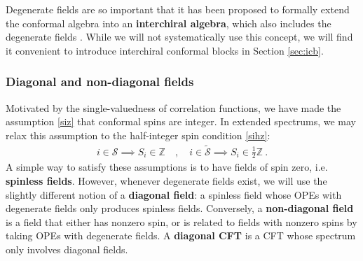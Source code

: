 \documentclass[12pt, a4paper]{article}
\theoremstyle{break}
\begin{document}
Degenerate fields are so important that it has been proposed to formally extend the conformal algebra into an \textbf{interchiral algebra}, which also includes the degenerate fields \cite{grs12}. While we will not systematically use this concept, we will find it convenient to introduce interchiral conformal blocks in Section \ref{sec:icb}. 

\subsubsection{Diagonal and non-diagonal fields}

Motivated by the single-valuedness of correlation functions, we have made the assumption \eqref{siz} that conformal spins are integer. In extended spectrums, we may relax this assumption to the half-integer spin condition \eqref{sihz}:
\begin{align}
 i\in\mathcal{S}\implies S_i\in\mathbb{Z} \quad , \quad i \in \widetilde{\mathcal{S}}\implies S_i\in\frac12\mathbb{Z}\ . 
\end{align}
A simple way to satisfy these assumptions is to have fields of spin zero, i.e. \textbf{spinless fields}. However, whenever degenerate fields exist, we will use the slightly different notion of a \textbf{diagonal field}: a spinless field whose OPEs with degenerate fields only produces spinless fields. Conversely, a \textbf{non-diagonal field} is a field that either has nonzero spin, or is related to fields with nonzero spins by taking OPEs with degenerate fields. A \textbf{diagonal CFT} is a CFT whose spectrum only involves diagonal fields.  
\end{document}
